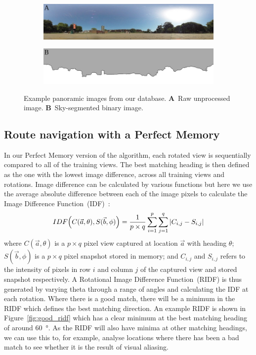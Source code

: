 \documentclass[letterpaper]{article}
\begin{document}
\begin{figure}[t]
    \centering
    \begin{subfigure}[b]{\columnwidth}
        \includegraphics[width=\columnwidth]{figures/360_240.jpg}
    \end{subfigure}
    \begin{subfigure}[b]{\columnwidth}
        \includegraphics[width=\columnwidth]{figures/360_240_mask.png}
    \end{subfigure}
    \caption{Example panoramic images from our database.
    \textbf{A}~Raw unprocessed image.
    \textbf{B}~Sky-segmented binary image.}
    \label{fig:database_images}
\end{figure}

\subsection{Route navigation with a Perfect Memory}
\label{sec:ridf_perfect_memory}
In our Perfect Memory version of the algorithm, each rotated view is sequentially compared to all of the training views. 
The best matching heading is then defined as the one with the lowest image difference, across all training views and rotations. 
Image difference can be calculated by various functions but here we use the average absolute difference between each of the image pixels to calculate the Image Difference Function~(IDF)~\citep{Zeil2003}:
%
\begin{align}
    IDF\Bigl(C(\vec{a}, \theta), S(\vec{b}, \phi)\Bigr) = \frac{1}{p \times q} \sum\limits_{i=1}^p{\sum\limits_{j=1}^q|{C_{i,j} - S_{i,j}|}}
\end{align}
%
where $C(\vec{a}, \theta)$ is a $p \times q$ pixel view captured at location $\vec{a}$ with heading $\theta$; $S(\vec{b}, \phi)$ is a $p \times q$ pixel snapshot stored in memory; and $C_{i,j}$ and $S_{i,j}$ refers to the intensity of pixels in row $i$ and column $j$ of the captured view and stored snapshot respectively.
A Rotational Image Difference Function~(RIDF) is thus generated by varying theta through a range of angles and calculating the IDF at each rotation. 
Where there is a good match, there will be a minimum in the RIDF which defines the best matching direction. 
An example RIDF is shown in Figure~\ref{fig:good_ridf} which has a clear minimum at the best matching heading of around \SI{60}{\degree}.
As the RIDF will also have minima at other matching headings, we can use this to, for example, analyse locations where there has been a bad match to see whether it is the result of visual aliasing.
\end{document}
